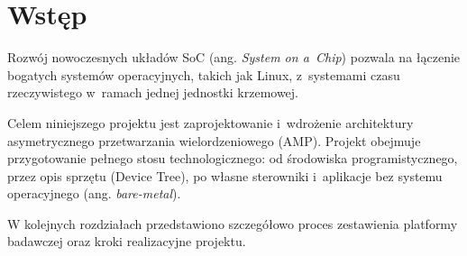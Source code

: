 \chapter{Wstęp}
\label{ch:wstep}

Rozwój nowoczesnych układów SoC (ang. \textit{System on a~Chip}) pozwala na łączenie bogatych systemów operacyjnych, takich jak Linux, z~systemami czasu rzeczywistego w~ramach jednej jednostki krzemowej. 

Celem niniejszego projektu jest zaprojektowanie i~wdrożenie architektury asymetrycznego przetwarzania wielordzeniowego (AMP). Projekt obejmuje przygotowanie pełnego stosu technologicznego: od środowiska programistycznego, przez opis sprzętu (Device Tree), po własne sterowniki i~aplikacje bez systemu operacyjnego (ang. \textit{bare-metal}).

W kolejnych rozdziałach przedstawiono szczegółowo proces zestawienia platformy badawczej oraz kroki realizacyjne projektu.